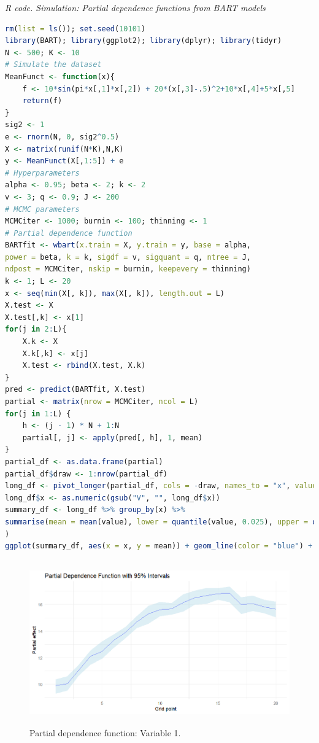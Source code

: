 \begin{enumerate}[leftmargin=*]
\begin{tcolorbox}[enhanced,width=4.67in,center upper,
	fontupper=\large\bfseries,drop shadow southwest,sharp corners]
	\textit{R code. Simulation: Partial dependence functions from BART models}
	\begin{VF}
		\begin{lstlisting}[language=R]
rm(list = ls()); set.seed(10101)
library(BART); library(ggplot2); library(dplyr); library(tidyr)
N <- 500; K <- 10
# Simulate the dataset
MeanFunct <- function(x){
	f <- 10*sin(pi*x[,1]*x[,2]) + 20*(x[,3]-.5)^2+10*x[,4]+5*x[,5]
	return(f)
}
sig2 <- 1
e <- rnorm(N, 0, sig2^0.5)
X <- matrix(runif(N*K),N,K)
y <- MeanFunct(X[,1:5]) + e
# Hyperparameters
alpha <- 0.95; beta <- 2; k <- 2
v <- 3; q <- 0.9; J <- 200
# MCMC parameters
MCMCiter <- 1000; burnin <- 100; thinning <- 1
# Partial dependence function
BARTfit <- wbart(x.train = X, y.train = y, base = alpha,
power = beta, k = k, sigdf = v, sigquant = q, ntree = J,
ndpost = MCMCiter, nskip = burnin, keepevery = thinning)
k <- 1; L <- 20
x <- seq(min(X[, k]), max(X[, k]), length.out = L)
X.test <- X
X.test[,k] <- x[1]
for(j in 2:L){
	X.k <- X
	X.k[,k] <- x[j]
	X.test <- rbind(X.test, X.k)
} 
pred <- predict(BARTfit, X.test)
partial <- matrix(nrow = MCMCiter, ncol = L)
for(j in 1:L) {
	h <- (j - 1) * N + 1:N
	partial[, j] <- apply(pred[, h], 1, mean)
}
partial_df <- as.data.frame(partial)
partial_df$draw <- 1:nrow(partial_df)
long_df <- pivot_longer(partial_df, cols = -draw, names_to = "x", values_to = "value")
long_df$x <- as.numeric(gsub("V", "", long_df$x))
summary_df <- long_df %>% group_by(x) %>%
summarise(mean = mean(value), lower = quantile(value, 0.025), upper = quantile(value, 0.975)
)
ggplot(summary_df, aes(x = x, y = mean)) + geom_line(color = "blue") + geom_ribbon(aes(ymin = lower, ymax = upper), fill = "lightblue", alpha = 0.4) + labs(x = "Grid point", y = "Partial effect", title = "Partial Dependence Function with 95% Intervals") + theme_minimal()
\end{lstlisting}
	\end{VF}
\end{tcolorbox} 

\begin{figure}[!h]
	\includegraphics[width=340pt, height=200pt]{Chapters/chapter13/figures/Partial1.png}
	\caption[List of figure caption goes here]{Partial dependence function: Variable 1.}\label{figPartial1}
\end{figure}


\end{enumerate}

